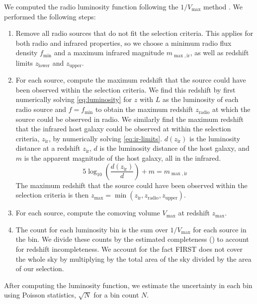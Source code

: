   We computed the radio luminosity function following the $1/V_{\max}$ method
  \citep{schmidt1968vmax}. We performed the
  following steps:
  \begin{enumerate}
    \item Remove all radio sources that do not fit the selection criteria.
      This applies for both radio and infrared properties, so we choose a minimum radio flux density $f_{\min}$ and a maximum infrared magnitude
      $m_{\max,\text{ir}}$, as well as redshift limits $z_{\mathrm{lower}}$ and $z_{\mathrm{upper}}$.
    \item For each source, compute the maximum redshift that the source could
      have been observed within the selection criteria. We find this redshift
      by first numerically solving \autoref{eq:luminosity} for $z$ with $L$ as
      the luminosity of each radio source and $f = f_{\min}$ to obtain the
      maximum redshift $z_\text{radio}$ at which the source could be observed
      in radio. We similarly find the maximum redshift that the infrared host
      galaxy could be observed at within the selection criteria, $z_{\text{ir}}$, by numerically
      solving \autoref{eq:ir-limits}. $d(z_{\text{ir}})$ is the luminosity
      distance at a redshift $z_{\text{ir}}$, $d$ is the luminosity distance of the host
      galaxy, and $m$ is the apparent magnitude of the host galaxy, all in the infrared.
      \begin{equation}
        \label{eq:ir-limits}
        5 \log_{10}\left(\frac{d(z_{\text{ir}})}{d}\right) + m = m_{\max,\text{ir}}
      \end{equation}
      The maximum redshift that the source could have been observed within the
      selection criteria is then $z_{\mathrm{max}} = \min(z_{\mathrm{ir}}, z_{\mathrm{radio}}, z_{\mathrm{upper}})$.
    \item For each source, compute the comoving volume $V_{\mathrm{max}}$ at
      redshift $z_{\mathrm{max}}$.
    \item The count for each luminosity bin is the sum over $1 / V_{\max}$ for
      each source in the bin. We divide these counts by the estimated completeness () to account for redshift incompleteness.
      We account for the fact FIRST does not cover the
      whole sky by multiplying by the total area of the sky divided by the area
      of our selection.
  \end{enumerate}

  After computing the luminosity function, we estimate the uncertainty in each bin using Poisson statistics, $\sqrt{N}$ for a bin count $N$.

